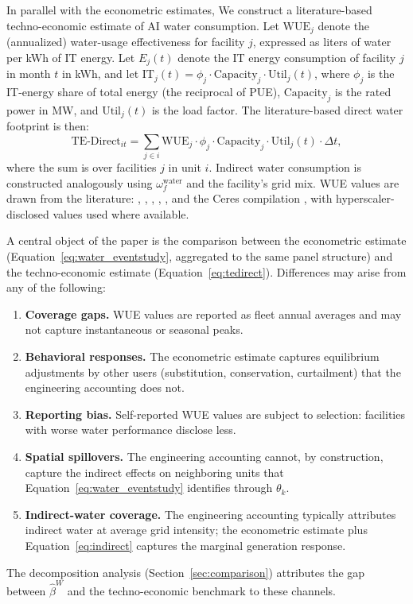 \documentclass[11pt, letterpaper]{article}
\begin{document}
In parallel with the econometric estimates, We construct a literature-based techno-economic estimate of AI water consumption. Let $\text{WUE}_j$ denote the (annualized) water-usage effectiveness for facility $j$, expressed as liters of water per kWh of IT energy. Let $E_j(t)$ denote the IT energy consumption of facility $j$ in month $t$ in kWh, and let $\text{IT}_j(t) = \phi_j \cdot \text{Capacity}_j \cdot \text{Util}_j(t)$, where $\phi_j$ is the IT-energy share of total energy (the reciprocal of PUE), $\text{Capacity}_j$ is the rated power in MW, and $\text{Util}_j(t)$ is the load factor. The literature-based direct water footprint is then:
\begin{equation}
\text{TE-Direct}_{it} = \sum_{j \in i} \text{WUE}_j \cdot \phi_j \cdot \text{Capacity}_j \cdot \text{Util}_j(t) \cdot \Delta t,
\label{eq:tedirect}
\end{equation}
where the sum is over facilities $j$ in unit $i$. Indirect water consumption is constructed analogously using $\omega_f^{\text{water}}$ and the facility's grid mix. WUE values are drawn from the literature: \citet{li2023making}, \citet{mytton2021data}, \citet{lei2025water}, \citet{shumba2025water}, \citet{herrera2025sustainable}, and the Ceres compilation \citep{ceres_drained_by_data_2025}, with hyperscaler-disclosed values used where available.

A central object of the paper is the comparison between the econometric estimate (Equation~\eqref{eq:water_eventstudy}, aggregated to the same panel structure) and the techno-economic estimate (Equation~\eqref{eq:tedirect}). Differences may arise from any of the following:
\begin{enumerate}[label=(\roman*)]
\item \textbf{Coverage gaps.} WUE values are reported as fleet annual averages and may not capture instantaneous or seasonal peaks.
\item \textbf{Behavioral responses.} The econometric estimate captures equilibrium adjustments by other users (substitution, conservation, curtailment) that the engineering accounting does not.
\item \textbf{Reporting bias.} Self-reported WUE values are subject to selection: facilities with worse water performance disclose less.
\item \textbf{Spatial spillovers.} The engineering accounting cannot, by construction, capture the indirect effects on neighboring units that Equation~\eqref{eq:water_eventstudy} identifies through $\theta_k$.
\item \textbf{Indirect-water coverage.} The engineering accounting typically attributes indirect water at average grid intensity; the econometric estimate plus Equation~\eqref{eq:indirect} captures the marginal generation response.
\end{enumerate}
The decomposition analysis (Section~\ref{sec:comparison}) attributes the gap between $\widehat{\beta}^{W}$ and the techno-economic benchmark to these channels.
\end{document}
